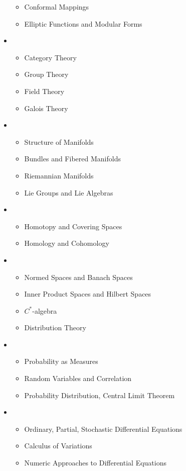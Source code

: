 \begin{itemize}
\begin{itemize}
        \item Conformal Mappings
        \item Elliptic Functions and Modular Forms
    \end{itemize}
    \item {}
    \begin{itemize}
        \item Category Theory
        \item Group Theory
        \item Field Theory
        \item Galois Theory
    \end{itemize}
    \item {}
    \begin{itemize}
        \item Structure of Manifolds
        \item Bundles and Fibered Manifolds
        \item Riemannian Manifolds
        \item Lie Groups and Lie Algebras
    \end{itemize}
    \item {}
    \begin{itemize}
        \item Homotopy and Covering Spaces
        \item Homology and Cohomology
    \end{itemize}
    \item {}
    \begin{itemize}
        \item Normed Spaces and Banach Spaces
        \item Inner Product Spaces and Hilbert Spaces
        \item \(C^\ast\)-algebra
        \item Distribution Theory
    \end{itemize}
    \item {}
    \begin{itemize}
        \item Probability as Measures
        \item Random Variables and Correlation
        \item Probability Distribution, Central Limit Theorem
    \end{itemize}
    \item {}
    \begin{itemize}
        \item Ordinary, Partial, Stochastic Differential Equations
        \item Calculus of Variations
        \item Numeric Approaches to Differential Equations
    \end{itemize}
\end{itemize}

